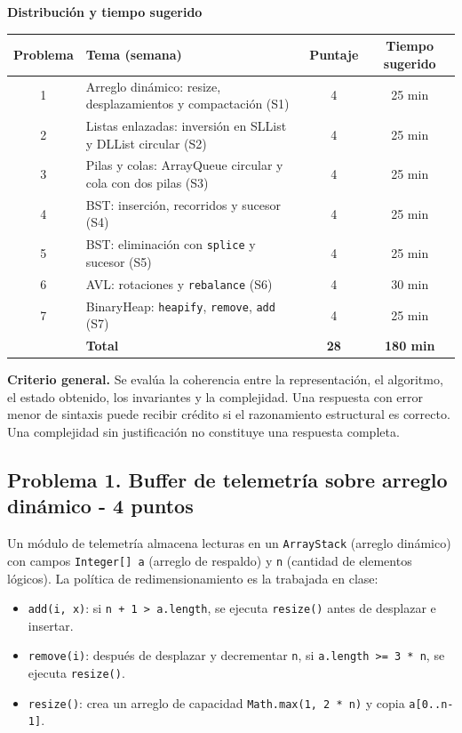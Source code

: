 \documentclass[11pt,a4paper]{article}
\begin{document}
\textbf{Distribución y tiempo sugerido}

\begin{center}
\small
\begin{tabular}{clcc}
\toprule
\textbf{Problema} & \textbf{Tema (semana)} & \textbf{Puntaje} & \textbf{Tiempo sugerido} \\
\midrule
1 & Arreglo dinámico: resize, desplazamientos y compactación (S1) & 4 & 25 min \\
2 & Listas enlazadas: inversión en SLList y DLList circular (S2) & 4 & 25 min \\
3 & Pilas y colas: ArrayQueue circular y cola con dos pilas (S3) & 4 & 25 min \\
4 & BST: inserción, recorridos y sucesor (S4) & 4 & 25 min \\
5 & BST: eliminación con \texttt{splice} y sucesor (S5) & 4 & 25 min \\
6 & AVL: rotaciones y \texttt{rebalance} (S6) & 4 & 30 min \\
7 & BinaryHeap: \texttt{heapify}, \texttt{remove}, \texttt{add} (S7) & 4 & 25 min \\
\midrule
 & \textbf{Total} & \textbf{28} & \textbf{180 min} \\
\bottomrule
\end{tabular}
\end{center}

\textbf{Criterio general.} Se evalúa la coherencia entre la representación, el algoritmo, el estado obtenido, los invariantes y la complejidad. Una respuesta con error menor de sintaxis puede recibir crédito si el razonamiento estructural es correcto. Una complejidad sin justificación no constituye una respuesta completa.

\newpage
\subsection*{Problema 1. Buffer de telemetría sobre arreglo dinámico - 4 puntos}

Un módulo de telemetría almacena lecturas en un \texttt{ArrayStack} (arreglo dinámico) con campos \texttt{Integer[] a} (arreglo de respaldo) y \texttt{n} (cantidad de elementos lógicos). La política de redimensionamiento es la trabajada en clase:

\begin{itemize}[itemsep=0pt]
\item \texttt{add(i, x)}: si \texttt{n + 1 > a.length}, se ejecuta \texttt{resize()} antes de desplazar e insertar.
\item \texttt{remove(i)}: después de desplazar y decrementar \texttt{n}, si \texttt{a.length >= 3 * n}, se ejecuta \texttt{resize()}.
\item \texttt{resize()}: crea un arreglo de capacidad \texttt{Math.max(1, 2 * n)} y copia \texttt{a[0..n-1]}.
\end{itemize}
\end{document}
